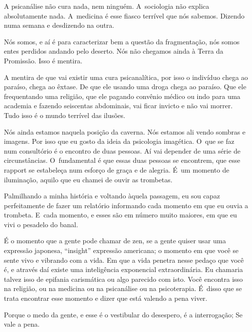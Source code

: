  

A psicanálise não cura nada, nem ninguém. A~sociologia não explica
absolutamente nada. A~medicina é esse fiasco terrível que nós sabemos.
Dizendo numa semana e desdizendo na outra.

 

Nós somos, e aí é para caracterizar bem a questão da fragmentação, nós
somos entes perdidos andando pelo deserto. Nós não chegamos ainda à
Terra da Promissão. Isso é mentira.

 

A mentira de que vai existir uma cura psicanalítica, por isso o
indivíduo chega ao paraíso, chega ao êxtase. De que ele usando uma droga
chega ao paraíso. Que ele frequentando uma religião, que ele pagando
convênio médico ou indo para uma academia e fazendo seiscentas
abdominais, vai ficar invicto e não vai morrer. Tudo isso é o mundo
terrível das ilusões.

 

Nós ainda estamos naquela posição da caverna. Nós estamos ali vendo
sombras e imagens. Por isso que eu gosto da ideia da psicologia
imagética. O~que se faz num consultório é o encontro de duas pessoas. Aí
vai depender de uma série de circunstâncias. O~fundamental é que essas
duas pessoas se encontrem, que esse rapport se estabeleça num esforço de
graça e de alegria. É~um momento de iluminação, aquilo que eu chamei de
ouvir as trombetas.

 

Palmilhando a minha história e voltando àquela passagem, eu sou capaz
perfeitamente de fazer um relatório informando cada momento em que eu
ouvia a trombeta. E~cada momento, e esses são em número muito maiores,
em que eu vivi o pesadelo do banal.

 

É o momento que a gente pode chamar de zen, se a gente quiser usar uma
expressão japonesa, ``insight'' expressão americana; o momento em que
você se sente vivo e vibrando com a vida. Em que a vida penetra nesse
pedaço que você é, e através daí existe uma inteligência exponencial
extraordinária. Eu chamaria talvez isso de epifania carismática ou algo
parecido com isto. Você encontra isso na religião, ou na medicina ou na
psicanálise ou na psicoterapia. É~disso que se trata encontrar esse
momento e dizer que está valendo a pena viver.

 

Porque o medo da gente, e esse é o vestibular do desespero, é a
interrogação; Se vale a pena.

